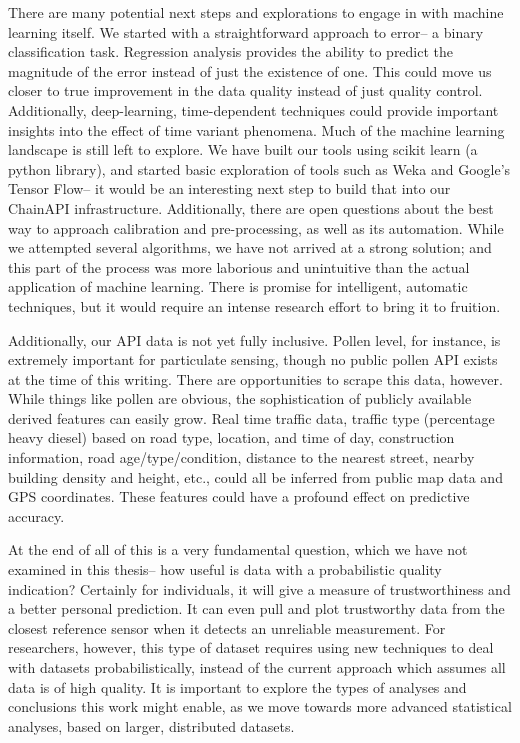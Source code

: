 There are many potential next steps and explorations to engage in with machine learning itself.  We started with a straightforward approach to error-- a binary classification task.  Regression analysis provides the ability to predict the magnitude of the error instead of just the existence of one.  This could move us closer to true improvement in the data quality instead of just quality control.  Additionally, deep-learning, time-dependent techniques could provide important insights into the effect of time variant phenomena.  Much of the machine learning landscape is still left to explore.  We have built our tools using scikit learn (a python library), and started basic exploration of tools such as Weka and Google's Tensor Flow-- it would be an interesting next step to build that into our ChainAPI infrastructure.   Additionally, there are open questions about the best way to approach calibration and pre-processing, as well as its automation.  While we attempted several algorithms, we have not arrived at a strong solution; and this part of the process was more laborious and unintuitive than the actual application of machine learning.  There is promise for intelligent, automatic techniques, but it would require an intense research effort to bring it to fruition. 

Additionally, our API data is not yet fully inclusive.  Pollen level, for instance, is extremely important for particulate sensing, though no public pollen API exists at the time of this writing.  There are opportunities to scrape this data, however.  While things like pollen are  obvious, the sophistication of publicly available derived features can easily grow.  Real time traffic data, traffic type (percentage heavy diesel) based on road type, location, and time of day, construction information, road age/type/condition, distance to the nearest street, nearby building density and height, etc., could all be inferred from public map data and GPS coordinates.  These features could have a profound effect on predictive accuracy.

At the end of all of this is a very fundamental question, which we have not examined in this thesis-- how useful is data with a probabilistic quality indication?  Certainly for individuals, it will give a measure of trustworthiness and a better personal prediction.  It can even pull and plot trustworthy data from the closest reference sensor when it detects an unreliable measurement.   For researchers, however, this type of dataset requires using new techniques to deal with datasets probabilistically, instead of the current approach which assumes all data is of high quality.  It is important to explore the types of analyses and conclusions this work might enable, as we move towards more advanced statistical analyses, based on larger, distributed datasets.

